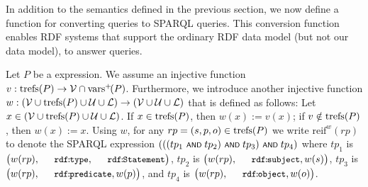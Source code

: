 In addition to the {\SPARQLplus} semantics defined in the previous section, we now define
	a function for converting {\SPARQLplus} queries to SPARQL queries. This conversion function
enables RDF systems that support the ordinary RDF data model (but not our {\RDFplus} data model), to answer {\SPARQLplus} queries.


Let $P$ be a {\SPARQLplus} expression. We assume an  injective function $v : \mathrm{trefs}(P) \rightarrow \mathcal{V} \cap \mathrm{vars}^+\!(P)$. Furthermore, we introduce another injective function $w : (\mathcal{V} \cup \mathrm{trefs}(P) \cup \mathcal{U} \cup \mathcal{L}) \rightarrow (\mathcal{V} \cup \mathcal{U} \cup \mathcal{L})$ that is defined as follows: Let $x \in (\mathcal{V} \cup \mathrm{trefs}(P) \cup \mathcal{U} \cup \mathcal{L})$. If $x \in \mathrm{trefs}(P)$, then $w(x) := v(x)$; if $v \notin \mathrm{trefs}(P)$, then $w(x) := x$.
%
Using $w$, for any $rp = (s,p,o) \in \mathrm{trefs}(P)$ we write $\mathrm{reif}^w( rp )$ to denote
	the SPARQL expression $( ( ( tp_1 \text{ \normalfont\scriptsize\textsf{AND} } tp_2 ) \text{ \normalfont\scriptsize\textsf{AND} } tp_3 ) \text{ \normalfont\scriptsize\textsf{AND} } tp_4 )$ where $tp_1$ is $\bigl(w(rp),\mathTinyRDF{rdf\!:\!type},\mathTinyRDF{rdf\!:\!Statement}\bigr)$, $tp_2$ is $\bigl(w(rp),\mathTinyRDF{rdf\!:\!subject},w(s)\bigr)$, $tp_3$ is $\bigl(w(rp),\mathTinyRDF{rdf\!:\!predicate},w(p)\bigr)$, and $tp_4$ is $\bigl(w(rp),\mathTinyRDF{rdf\!:\!object},w(o)\bigr)$.

